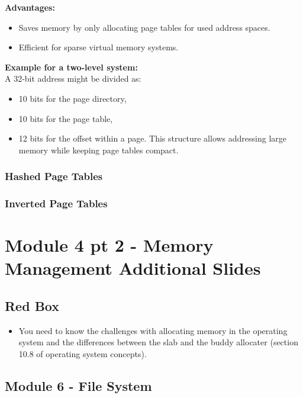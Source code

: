 \documentclass{article}
\begin{document}
{\bf Advantages:}
\begin{itemize}
    \item Saves memory by only allocating page tables for used address spaces.
    \item Efficient for sparse virtual memory systems.
\end{itemize}

{\bf Example for a two-level system:} 
\\
A 32-bit address might be divided as: 
\begin{itemize}
    \item 10 bits for the page directory,
    \item 10 bits for the page table,
    \item 12 bits for the offset within a page.
    This structure allows addressing large memory while keeping page tables compact.
\end{itemize}

\subsubsection{Hashed Page Tables}



\subsubsection{Inverted Page Tables}


\section{Module 4 pt 2 - Memory Management Additional Slides}
\subsection{Red Box}
\begin{itemize}
    \item You need to know the challenges with allocating memory in the operating system and the differences between the slab and the buddy
    allocater (section 10.8 of operating system concepts).
\end{itemize}


\subsection{Module 6 - File System}
\end{document}
